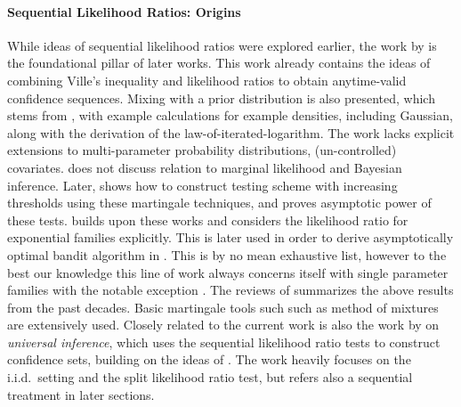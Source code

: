 \paragraph{Sequential Likelihood Ratios: Origins}
While ideas of sequential likelihood ratios were explored earlier, the work by \citet{robbins1970statistical} is the foundational pillar of later works. This work already contains the ideas of combining Ville's inequality and likelihood ratios to obtain anytime-valid confidence sequences. Mixing with a prior distribution is also presented, which stems from \citet{robbins1970boundary}, with example calculations for example densities, including Gaussian, along with the derivation of the law-of-iterated-logarithm. The work lacks explicit extensions to multi-parameter probability distributions, (un-controlled) covariates. \citet{robbins1970statistical} does not discuss relation to marginal likelihood and Bayesian inference. Later, \cite{Robbins1972} shows how to construct testing scheme with increasing thresholds using these martingale techniques, and proves asymptotic power of these tests. \citet{lai1976confidence} builds upon these works and considers the likelihood ratio for exponential families explicitly. This is later used in order to derive asymptotically optimal bandit algorithm in \cite{lai1985asymptotically}. This is by no mean exhaustive list, however to the best our knowledge this line of work always concerns itself with single parameter families with the notable exception \cite{lai1994modification}. The reviews of \cite{lai2001sequential, lai2009martingales} summarizes the above results from the past decades. Basic martingale tools such such as method of mixtures are extensively used. Closely related to the current work is also the work by \cite{wasserman2020universal} on \emph{universal inference}, which uses the sequential likelihood ratio tests to construct confidence sets, building on the ideas of \cite{robbins1970statistical}. The work heavily focuses on the i.i.d.~setting and the split likelihood ratio test, but refers also a sequential treatment in later sections. 

